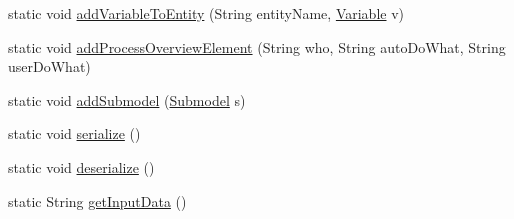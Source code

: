 \begin{DoxyCompactItemize}
\item 
static void \hyperlink{classit_1_1isislab_1_1masonassisteddocumentation_1_1_o_d_d_1_1_o_d_d_a887bf7e520250436a12ed549405af270}{add\-Variable\-To\-Entity} (String entity\-Name, \hyperlink{classit_1_1isislab_1_1masonassisteddocumentation_1_1_o_d_d_1_1_variable}{Variable} v)
\item 
static void \hyperlink{classit_1_1isislab_1_1masonassisteddocumentation_1_1_o_d_d_1_1_o_d_d_a7a9575a10f1f2b86707ff0b376a9d6be}{add\-Process\-Overview\-Element} (String who, String auto\-Do\-What, String user\-Do\-What)
\item 
static void \hyperlink{classit_1_1isislab_1_1masonassisteddocumentation_1_1_o_d_d_1_1_o_d_d_ab83c41dd3a0b73a3b56a4cd35fcb4f3c}{add\-Submodel} (\hyperlink{classit_1_1isislab_1_1masonassisteddocumentation_1_1_o_d_d_1_1_submodel}{Submodel} s)
\item 
static void \hyperlink{classit_1_1isislab_1_1masonassisteddocumentation_1_1_o_d_d_1_1_o_d_d_a41952d7bf650c3a85cb79058cb7c9ce8}{serialize} ()
\item 
static void \hyperlink{classit_1_1isislab_1_1masonassisteddocumentation_1_1_o_d_d_1_1_o_d_d_ab7b09ee32af669dfb46f6ca1d4d81f3b}{deserialize} ()
\item 
static String \hyperlink{classit_1_1isislab_1_1masonassisteddocumentation_1_1_o_d_d_1_1_o_d_d_a733268d9fc89d2fce7c31bdc1dbc8b15}{get\-Input\-Data} ()
\end{DoxyCompactItemize}

